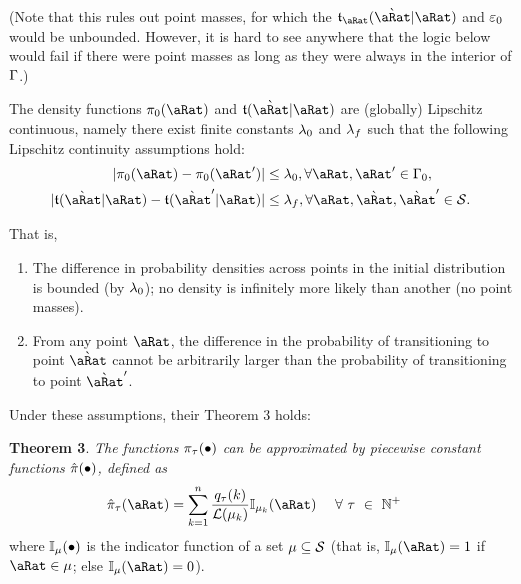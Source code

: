 \documentclass[\econtexRoot/BufferStockTheory.tex]{subfiles}
\begin{document}
(Note that this rules out point masses, for which the $\DnsPntNxtFmPntNow_{\pnt}(\Nxt{\pnt}|\pnt)$ and $\varepsilon_{0}$ would be unbounded.  However, it is hard to see anywhere that the logic below would fail if there were point masses as long as they were always in the interior of $\Gamma$.)

\begin{assumption}\label{assn:Lipschitz} The density functions $\DnsPnt_{0}(\pnt)$ and $\DnsPntNxtFmPntNow(\Nxt{\pnt}|\pnt)$ are (globally) Lipschitz continuous, namely there exist finite constants $\lambda_{0}$ and $\lambda_{f}$ such that the following Lipschitz continuity assumptions hold:
  \begin{align}
    |\DnsPnt_{0}(\pnt)-\DnsPnt_{0}(\pnt^{\prime})| & \leq \LipschitzDnsPntBnd, \forall \pnt,\pnt^{\prime}\in\KrnPntNxtFmPntNowSetSprtTrnc_{0}, \label{eq:LipCont}
    \\    |\DnsSetNxtFmPntNow(\Nxt{\pnt}|\pnt)-\DnsSetNxtFmPntNow(\Nxt{\pnt}^{\prime}|\pnt)| & \leq \LipschitzDnsPntNxtBnd, \forall \pnt,\Nxt{\pnt},\Nxt{\pnt}^{\prime}\in \SetFullCnts.    \notag
  \end{align}
\end{assumption}
  That is,
  \begin{enumerate}
  \item The difference in probability densities across points in the initial distribution is bounded (by $\lambda_{0}$); no density is infinitely more likely than another (no point masses).
    \item From any point $\pnt$, the difference in the probability of transitioning to point $\Nxt{\pnt}$ cannot be arbitrarily larger than the probability of transitioning to point $\Nxt{\pnt}^{\prime}$.  
  \end{enumerate}


Under these assumptions, their Theorem 3 holds:

\textbf{Theorem 3}. \textit{The functions $\pi_{\tau}(\bullet)$ can  be approximated by piecewise constant functions $\hat{\pi}(\bullet)$, defined as}
\begin{align}\label{eq:PrbBinNxtFmPntNow}
  \DnsPntAprx_{\tAbs}(\pnt) &= \sum_{\LoopC=1}^{\NumAprxStes} \frac{\pmfBinNow_{\tAbs}(\LoopC)}{\Lebes(\SetPartCnts_{\LoopC})} \mathbb{I}_{\SetPartCnts_{\LoopC}}(\pnt)~~~~\forall~\tAbs~\in~\Nteger^{+}
\end{align}where $\mathbb{I}_{\mu}(\bullet)$ is the indicator function of a set $\mu \subseteq \mathcal{S}$ (that is, $\mathbb{I}_{\SetPartCnts}(\pnt) = 1$ if $\pnt \in \SetPartCnts$; else $\mathbb{I}_{\SetPartCnts}(\pnt) = 0$).  %
\end{document}
